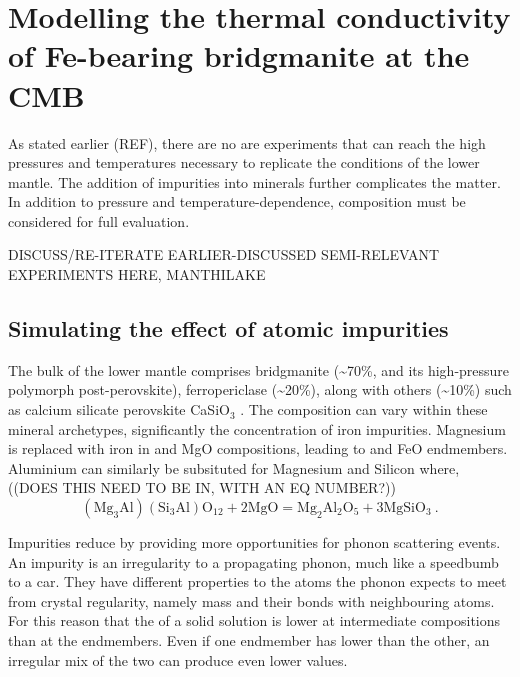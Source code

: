 \chapter{Modelling the thermal conductivity of Fe-bearing bridgmanite at the CMB} %

\label{Chapter4} %

As stated earlier (REF), there are no are experiments that can reach the high pressures and temperatures necessary to replicate the conditions of the lower mantle. The addition of impurities into minerals further complicates the matter. In addition to pressure and temperature-dependence, composition must be considered for full evaluation.

DISCUSS/RE-ITERATE EARLIER-DISCUSSED SEMI-RELEVANT EXPERIMENTS HERE, MANTHILAKE

\section{Simulating the effect of atomic impurities}

The bulk of the lower mantle comprises bridgmanite (\textasciitilde70\%, and its high-pressure polymorph post-perovskite), ferropericlase (\textasciitilde20\%), along with others (\textasciitilde10\%) such as calcium silicate perovskite CaSiO$_3$ \citep{Tronnes2009}. The composition can vary within these mineral archetypes, significantly the concentration of iron impurities. Magnesium is replaced with iron in 
\mgsios and MgO compositions, leading to \fesios and FeO endmembers. Aluminium can similarly be subsituted for Magnesium and Silicon
\citep[as in][]{Brodholt2000} where, ((DOES THIS NEED TO BE IN, WITH AN EQ NUMBER?))
%
\begin{equation}
\mathrm{ \left ( Mg_{3}Al \right )\left ( Si_{3}Al \right )O_{12} + 2MgO = Mg_{2}Al_{2}O_{5} + 3MgSiO_{3} }\ .
\label{eq.brodholt_al}
\end{equation}
%

Impurities reduce \tcs by providing more opportunities for phonon scattering events. An impurity is an irregularity to a propagating phonon, much like a speedbumb to a car. They have different properties to the atoms the phonon expects to meet from crystal regularity, namely mass and their bonds with neighbouring atoms. For this reason that the \tcs of a solid solution is lower at intermediate compositions than at the endmembers. Even if one endmember has lower \cs than the other, an irregular mix of the two can produce even lower values.


